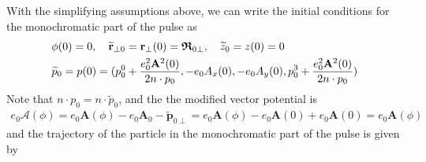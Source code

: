 With the simplifying assumptions above, we can write the initial conditions for the monochromatic part of the pulse as
\begin{align}
   & \phi(0) = 0, \quad \widetilde{\bf r}_{\perp0}={\bf r}_{\perp}(0) = {\boldsymbol{\mathfrak R}}_{0 \perp}, \quad \widetilde z_0=z(0) = 0\nonumber                         \\
   & \widetilde p_0=p(0) = (p_0^0 + \frac{e_{0}^{2} \mathbf{A}^{2}(0)}{2 n \cdot p_{0}},-e_0A_x(0), -e_0A_y(0), p_0^3 + \frac{e_{0}^{2} \mathbf{A}^{2}(0)}{2 n \cdot p_{0}})
\end{align}
Note that $n\cdot p_0 = n\cdot  \widetilde p_0$, and  the  the modified vector potential is
\begin{align}
  e_{0} \boldsymbol{\mathcal{A}}(\phi)=e_{0} \mathbf{A}(\phi)-e_{0} \mathbf{A}_{0}-\widetilde{\mathbf{p}}_{0 \perp}=e_{0} \mathbf{A}(\phi)-e_{0} \mathbf{A}(0)+e_0 {\mathbf{A}}(0) = e_{0} \mathbf{A}(\phi)
\end{align}
and the trajectory of the particle in the monochromatic part of the pulse is given by
